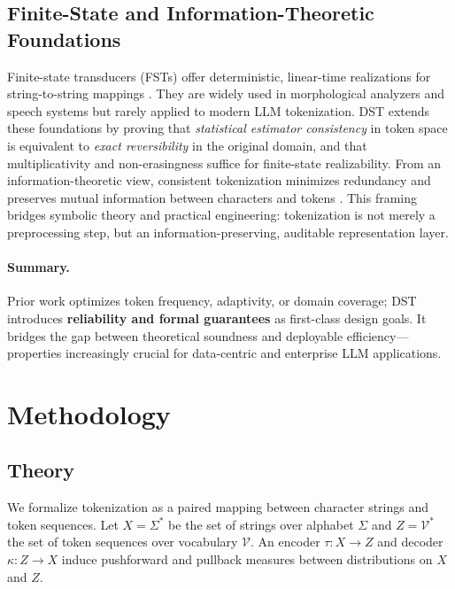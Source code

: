 \subsection{Finite-State and Information-Theoretic Foundations}

Finite-state transducers (FSTs) offer deterministic, linear-time realizations for string-to-string mappings \citep{Mohri2004FST, Roark2011GrammarTokenization}.
They are widely used in morphological analyzers and speech systems but rarely applied to modern LLM tokenization.
DST extends these foundations by proving that \emph{statistical estimator consistency} in token space is equivalent to \emph{exact reversibility} in the original domain, and that multiplicativity and non-erasingness suffice for finite-state realizability.
From an information-theoretic view, consistent tokenization minimizes redundancy and preserves mutual information between characters and tokens \citep{JurafskyMartin2023SpeechNLP, Ding2023ByteLevelTradeoff}.
This framing bridges symbolic theory and practical engineering: tokenization is not merely a preprocessing step, but an information-preserving, auditable representation layer.

\paragraph{Summary.}
Prior work optimizes token frequency, adaptivity, or domain coverage; DST introduces \textbf{reliability and formal guarantees} as first-class design goals.
It bridges the gap between theoretical soundness and deployable efficiency—properties increasingly crucial for data-centric and enterprise LLM applications.


\section{Methodology}
\label{sec:method}

\subsection{Theory}
\label{sec:theory}

\noindent We formalize tokenization as a paired mapping between character strings and token sequences.
Let $X=\Sigma^*$ be the set of strings over alphabet $\Sigma$ and $Z=\mathcal{V}^*$ the set of token sequences over vocabulary $\mathcal{V}$. An encoder $\tau\!:\!X\to Z$ and decoder $\kappa\!:\!Z\to X$ induce pushforward and pullback measures between distributions on $X$ and $Z$.

